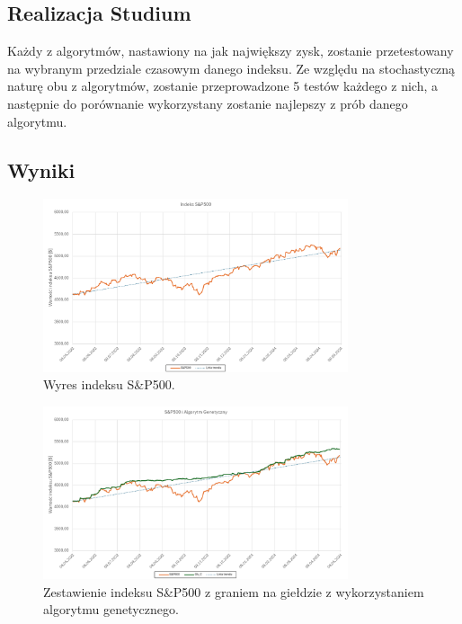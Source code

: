\documentclass[polish,envcountsect,10pt]{article}
\begin{document}
\subsection{Realizacja Studium}

Każdy z algorytmów, nastawiony na jak największy zysk, zostanie przetestowany na wybranym przedziale czasowym danego indeksu. Ze względu na stochastyczną naturę obu z algorytmów, zostanie przeprowadzone 5 testów każdego z nich, a następnie do porównanie wykorzystany zostanie najlepszy z prób danego algorytmu.

\subsection{Wyniki}

\begin{figure}[H]
    \centering
    \includegraphics[width=0.8\textwidth]{SP500.png}
    \caption{Wyres indeksu S\&P500. }
    \label{fig:SP500}
\end{figure}

\begin{figure}[H]
    \centering
    \includegraphics[width=0.8\textwidth]{GA_C.png}
    \caption{Zestawienie indeksu S\&P500 z graniem na giełdzie z wykorzystaniem algorytmu genetycznego. }
    \label{fig:GA_C}
\end{figure}
\end{document}
